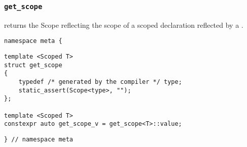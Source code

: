 
\subsubsection{\texttt{get\_scope}}

returns the Scope reflecting the scope of a scoped declaration reflected by a .

\begin{verbatim}
namespace meta {
\end{verbatim}
\begin{verbatim}
template <Scoped T>
struct get_scope
{
	typedef /* generated by the compiler */ type;
	static_assert(Scope<type>, "");
};
	
template <Scoped T>
constexpr auto get_scope_v = get_scope<T>::value;
\end{verbatim}
\begin{verbatim}
} // namespace meta
\end{verbatim}
